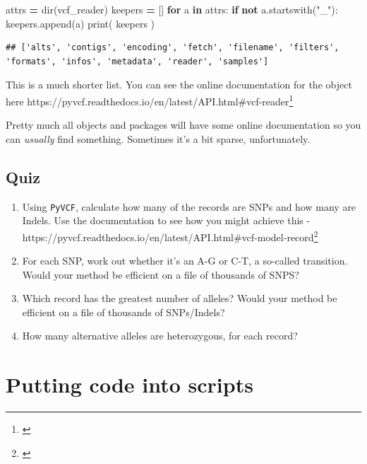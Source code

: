 \documentclass[]{book}
\newenvironment{Shaded}{\begin{snugshade}}{\end{snugshade}}
\newcommand{\BuiltInTok}[1]{#1}
\newcommand{\ControlFlowTok}[1]{\textcolor[rgb]{0.13,0.29,0.53}{\textbf{#1}}}
\newcommand{\KeywordTok}[1]{\textcolor[rgb]{0.13,0.29,0.53}{\textbf{#1}}}
\newcommand{\NormalTok}[1]{#1}
\newcommand{\OperatorTok}[1]{\textcolor[rgb]{0.81,0.36,0.00}{\textbf{#1}}}
\newcommand{\StringTok}[1]{\textcolor[rgb]{0.31,0.60,0.02}{#1}}
\providecommand{\tightlist}{%
  \setlength{\itemsep}{0pt}\setlength{\parskip}{0pt}}
\let\rmarkdownfootnote\footnote%
\def\footnote{\protect\rmarkdownfootnote}
\renewcommand{\href}[2]{#2\footnote{\url{#1}}}
\theoremstyle{definition}
\theoremstyle{definition}
\theoremstyle{definition}
\theoremstyle{remark}
\begin{document}
\begin{Shaded}
\begin{Highlighting}[]
\NormalTok{attrs }\OperatorTok{=} \BuiltInTok{dir}\NormalTok{(vcf_reader)}
\NormalTok{keepers }\OperatorTok{=}\NormalTok{ []}
\ControlFlowTok{for}\NormalTok{ a }\KeywordTok{in}\NormalTok{ attrs:}
  \ControlFlowTok{if} \KeywordTok{not}\NormalTok{ a.startswith(}\StringTok{"_"}\NormalTok{):}
\NormalTok{    keepers.append(a)}
\BuiltInTok{print}\NormalTok{( keepers )}
\end{Highlighting}
\end{Shaded}

\begin{verbatim}
## ['alts', 'contigs', 'encoding', 'fetch', 'filename', 'filters', 'formats', 'infos', 'metadata', 'reader', 'samples']
\end{verbatim}

This is a much shorter list. You can see the online documentation for
the object here
\href{}{https://pyvcf.readthedocs.io/en/latest/API.html\#vcf-reader}

Pretty much all objects and packages will have some online documentation
so you can \emph{usually} find something. Sometimes it's a bit sparse,
unfortunately.

\hypertarget{quiz-5}{%
\section{Quiz}\label{quiz-5}}

\begin{enumerate}
\def\labelenumi{\arabic{enumi}.}
\tightlist
\item
  Using \texttt{PyVCF}, calculate how many of the records are SNPs and
  how many are Indels. Use the documentation to see how you might
  achieve this -
  \href{}{https://pyvcf.readthedocs.io/en/latest/API.html\#vcf-model-record}
\item
  For each SNP, work out whether it's an A-G or C-T, a so-called
  transition. Would your method be efficient on a file of thousands of
  SNPS?
\item
  Which record has the greatest number of alleles? Would your method be
  efficient on a file of thousands of SNPs/Indels?
\item
  How many alternative alleles are heterozygous, for each record?
\end{enumerate}

\hypertarget{putting-code-into-scripts}{%
\chapter{Putting code into scripts}\label{putting-code-into-scripts}}
\end{document}

